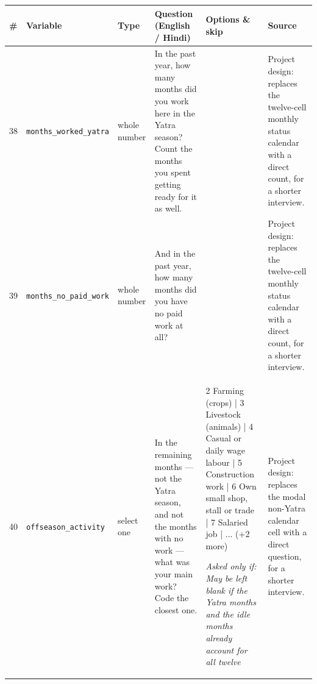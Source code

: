 \documentclass[9pt,a4paper,landscape]{article}
\begin{document}
\begin{longtable}{@{}p{0.5cm}p{3.3cm}p{1.7cm}p{7.3cm}p{5.6cm}p{5.4cm}@{}}
\toprule \footnotesize\textbf{\#} & \footnotesize\textbf{Variable} & \footnotesize\textbf{Type} & \footnotesize\textbf{Question (English / Hindi)} & \footnotesize\textbf{Options {\&} skip} & \footnotesize\textbf{Source}\\ \midrule
\endhead
\footnotesize 38 & \footnotesize\texttt{months\_worked\_yatra} & \scriptsize whole number & \footnotesize In the past year, how many months did you work here in the Yatra season? Count the months you spent getting ready for it as well.\par\vspace{1pt}{\footnotesize\color{hdr}{\hifont पिछले साल में आपने यात्रा के सीज़न में यहाँ कितने महीने काम किया? सीज़न की तैयारी के महीने भी गिनें।}} & \scriptsize  & \scriptsize Project design: replaces the twelve-cell monthly status calendar with a direct count, for a shorter interview.\\
\footnotesize 39 & \footnotesize\texttt{months\_no\_paid\_work} & \scriptsize whole number & \footnotesize And in the past year, how many months did you have no paid work at all?\par\vspace{1pt}{\footnotesize\color{hdr}{\hifont और पिछले साल में कितने महीने आपके पास कोई कमाई वाला काम नहीं था?}} & \scriptsize  & \scriptsize Project design: replaces the twelve-cell monthly status calendar with a direct count, for a shorter interview.\\
\footnotesize 40 & \footnotesize\texttt{offseason\_activity} & \scriptsize select one & \footnotesize In the remaining months — not the Yatra season, and not the months with no work — what was your main work? Code the closest one.\par\vspace{1pt}{\footnotesize\color{hdr}{\hifont बाकी महीनों में — जो यात्रा के सीज़न के नहीं थे और जिनमें काम भी था — आपका मुख्य काम क्या था? सबसे नज़दीकी चुनें।}} & \scriptsize 2 Farming (crops) | 3 Livestock (animals) | 4 Casual or daily wage labour | 5 Construction work | 6 Own small shop, stall or trade | 7 Salaried job | ... (+2 more)\par\vspace{1pt}\textit{Asked only if: May be left blank if the Yatra months and the idle months already account for all twelve} & \scriptsize Project design: replaces the modal non-Yatra calendar cell with a direct question, for a shorter interview.\\

\end{longtable}
\end{document}
